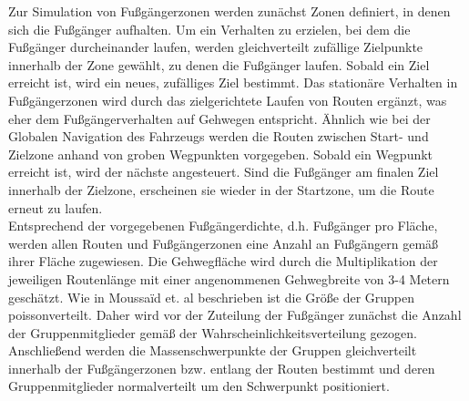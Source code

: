 Zur Simulation von Fußgängerzonen werden zunächst Zonen definiert, in denen sich
die Fußgänger aufhalten. Um ein Verhalten zu erzielen, bei dem die Fußgänger
durcheinander laufen, werden gleichverteilt zufällige Zielpunkte innerhalb
der Zone gewählt, zu denen die Fußgänger laufen. Sobald ein Ziel erreicht ist,
wird ein neues, zufälliges Ziel bestimmt.
Das stationäre Verhalten in Fußgängerzonen wird durch das zielgerichtete Laufen
von Routen ergänzt, was eher dem Fußgängerverhalten auf Gehwegen entspricht.
Ähnlich wie bei der Globalen Navigation des Fahrzeugs werden die Routen zwischen Start-
und Zielzone anhand von groben Wegpunkten vorgegeben. Sobald ein Wegpunkt erreicht ist,
wird der nächste angesteuert. Sind die Fußgänger am finalen Ziel innerhalb der
Zielzone, erscheinen sie wieder in der Startzone, um die Route erneut zu laufen.\\

Entsprechend der vorgegebenen Fußgängerdichte, d.h. Fußgänger pro Fläche, werden allen Routen
und Fußgängerzonen eine Anzahl an Fußgängern gemäß ihrer Fläche zugewiesen. Die Gehwegfläche
wird durch die Multiplikation der jeweiligen Routenlänge mit einer angenommenen Gehwegbreite
von 3-4 Metern geschätzt. Wie in Moussaïd et. al \cite{moussaid2010groupssf} beschrieben ist
die Größe der Gruppen poissonverteilt. Daher wird vor der Zuteilung der Fußgänger zunächst
die Anzahl der Gruppenmitglieder gemäß der Wahrscheinlichkeitsverteilung gezogen.
Anschließend werden die Massenschwerpunkte der Gruppen gleichverteilt innerhalb der
Fußgängerzonen bzw. entlang der Routen bestimmt und deren Gruppenmitglieder normalverteilt
um den Schwerpunkt positioniert.

